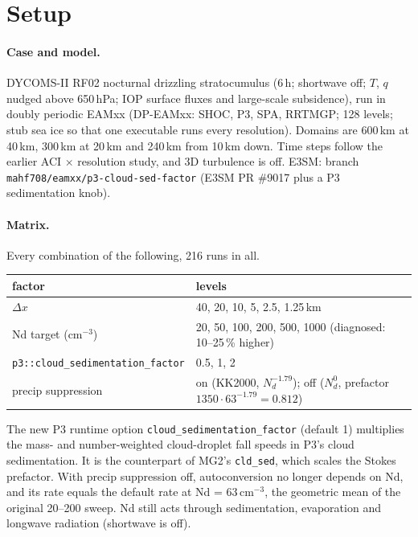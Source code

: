 \section{Setup}
\paragraph{Case and model.} DYCOMS-II RF02 nocturnal drizzling stratocumulus (6\,h; shortwave off; $T$, $q$ nudged above 650\,hPa;
IOP surface fluxes and large-scale subsidence), run in doubly periodic EAMxx (DP-EAMxx: SHOC, P3, SPA, RRTMGP; 128 levels;
stub sea ice so that one executable runs every resolution). Domains are 600\,km at 40\,km, 300\,km at 20\,km and 240\,km from 10\,km down.
Time steps follow the earlier ACI $\times$ resolution study, and 3D turbulence is off. E3SM: branch \texttt{mahf708/eamxx/p3-cloud-sed-factor}
(E3SM PR \#9017 plus a P3 sedimentation knob).

\paragraph{Matrix.} Every combination of the following, 216 runs in all.
\begin{center}\small
\begin{tabular}{@{}ll@{}}
\toprule
factor & levels \\ \midrule
$\Delta x$ & 40, 20, 10, 5, 2.5, 1.25\,km \\
Nd target (cm$^{-3}$) & 20, 50, 100, 200, 500, 1000 (diagnosed: 10--25\,\% higher) \\
\texttt{p3::cloud\_sedimentation\_factor} & 0.5, 1, 2 \\
precip suppression & on (KK2000, $N_d^{-1.79}$); off ($N_d^{0}$, prefactor $1350\cdot63^{-1.79}=0.812$) \\ \bottomrule
\end{tabular}
\end{center}
The new P3 runtime option \texttt{cloud\_sedimentation\_factor} (default 1) multiplies the mass- and number-weighted cloud-droplet
fall speeds in P3's cloud sedimentation. It is the counterpart of MG2's \texttt{cld\_sed}, which scales the Stokes prefactor.
With precip suppression off, autoconversion no longer depends on Nd, and its rate equals the default rate at Nd = 63\,cm$^{-3}$,
the geometric mean of the original 20--200 sweep. Nd still acts through sedimentation, evaporation and longwave radiation
(shortwave is off).


